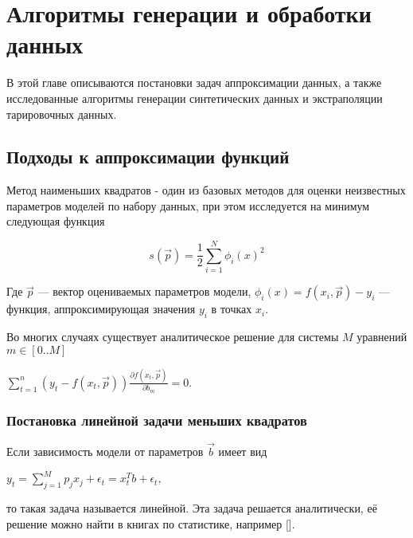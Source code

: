 \chapter{Алгоритмы генерации и обработки данных} \label{chapt2}

В этой главе описываются постановки задач аппроксимации данных, а также исследованные алгоритмы генерации 
синтетических данных и
экстраполяции тарировочных данных. 


\section{Подходы к аппроксимации функций}\label{sect2_1}
Метод наименьших квадратов - один из базовых методов для оценки неизвестных 
параметров моделей по набору данных, при этом исследуется на минимум 
следующая функция

\begin{equation}
\label{eq:square_minimum}
s(\vec{p}) = \frac{1}{2} \displaystyle \sum_{i=1}^N \phi_i(x)^2
\end{equation}




Где $\vec{p}$ --- вектор оцениваемых параметров модели, $\phi_i(x) = f(x_i, \vec{p}) - y_i $
--- функция, аппроксимирующая значения $y_i$ в точках $x_i$.

Во многих случаях существует аналитическое решение для системы $M$ уравнений 
$m \in [0..M]$
\begin{center}
 $ \displaystyle\sum_{t = 1}^n \left( y_t - f(x_t,\vec{p})\right) 
 \frac{\partial f(x_t, \vec{p})}{\partial b_m} = 0.$
\end{center}

\subsection{Постановка линейной задачи меньших квадратов}

Если зависимость модели от параметров $\vec{b}$ имеет вид 

\begin{center}
$ y_t = \displaystyle\sum_{j=1}^{M}p_j x_j + \epsilon_t = 
x^T_tb + \epsilon_t, $ 
\end{center}
 то такая задача называется линейной. Эта задача решается аналитически, 
её решение можно найти в книгах по статистике, например [].



